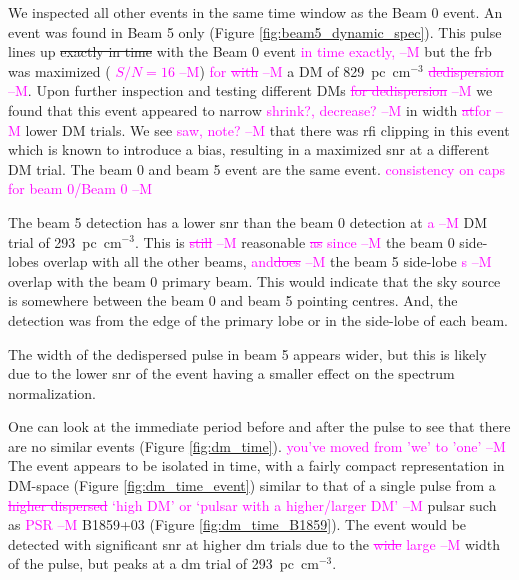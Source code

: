 \documentclass[a4paper,fleqn,usenatbib]{mnras}
\newcommand{\cM}[1]{\textcolor{magenta}{ #1 --M}}
\begin{document}
We inspected all other events in the same time window as the Beam 0 event. An
event was found in Beam 5 only (Figure \ref{fig:beam5_dynamic_spec}). This pulse
lines up \sout{exactly in time} with the Beam 0 event \cM{in time exactly,} but the \gls{frb} was maximized
(\cM{$S/N=16$}) \cM{for \sout{with}} a DM of 829~pc~cm$^{-3}$ \cM{\sout{dedispersion}}. Upon further inspection and
testing different DMs \cM{\sout{for dedispersion}} we found that this event appeared to
narrow\cM{shrink?, decrease?} in width \cM{\sout{at}for} lower DM trials. We see\cM{saw, note?} that there was \gls{rfi} clipping in
this event which is known to introduce a bias, resulting in a maximized
\gls{snr} at a different DM trial. The beam 0 and beam 5 event are the same
event. \cM{consistency on caps for beam 0/Beam 0}

The beam 5 detection has a lower \gls{snr} than the beam 0 detection at \cM{a} DM trial
of 293~pc~cm$^{-3}$. This is \cM{\sout{still}} reasonable \cM{\sout{as} since} the beam 0 side-lobes overlap
with all the other beams, \cM{and\sout{does}} the beam 5 side-lobe\cM{s} overlap with the beam 0
primary beam. This would indicate that the sky source is somewhere between the
beam 0 and beam 5 pointing centres. And, the detection was from the edge of the
primary lobe or in the side-lobe of each beam.

The width of the dedispersed pulse in beam 5 appears wider, but this is likely
due to the lower \gls{snr} of the event having a smaller effect on the
spectrum normalization.

One can look at the immediate period before and after the pulse to see that
there are no similar events (Figure \ref{fig:dm_time}). \cM{you've moved from 'we' to 'one'} The event appears to be
isolated in time, with a fairly compact representation in DM-space (Figure
\ref{fig:dm_time_event}) similar to that of a single pulse from a \cM{\sout{higher
dispersed} `high DM' or `pulsar with a higher/larger DM'} pulsar such as \cM{PSR} B1859+03 (Figure \ref{fig:dm_time_B1859}). The event
would be detected with significant \gls{snr} at higher \gls{dm} trials due to
the \cM{\sout{wide} large} width of the pulse, but peaks at a \gls{dm} trial of 293~pc~cm$^{-3}$.
\end{document}
